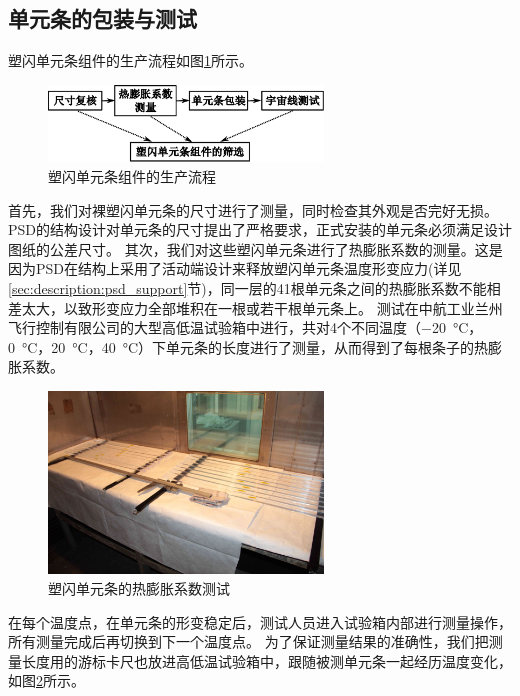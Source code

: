 \subsection{单元条的包装与测试}
\label{sec:construction:bar_wrapping_and_test}

塑闪单元条组件的生产流程如图\ref{fig:construction:bar_production}所示。
\begin{figure}[htbp]
	\centering
	\includegraphics[width=0.65\textwidth]{chap/construction/fig/bar_production.eps}
	\caption{塑闪单元条组件的生产流程}
	\label{fig:construction:bar_production}
\end{figure}
首先，我们对裸塑闪单元条的尺寸进行了测量，同时检查其外观是否完好无损。PSD的结构设计对单元条的尺寸提出了严格要求，正式安装的单元条必须满足设计图纸的公差尺寸。
其次，我们对这些塑闪单元条进行了热膨胀系数的测量。这是因为PSD在结构上采用了活动端设计来释放塑闪单元条温度形变应力(详见\ref{sec:description:psd_support}节)，同一层的41根单元条之间的热膨胀系数不能相差太大，以致形变应力全部堆积在一根或若干根单元条上。
测试在中航工业兰州飞行控制有限公司的大型高低温试验箱中进行，共对4个不同温度（\SI{-20}{\celsius}，\SI{0}{\celsius}，\SI{20}{\celsius}，\SI{40}{\celsius}）下单元条的长度进行了测量，从而得到了每根条子的热膨胀系数。
\begin{figure}[htbp]
	\centering
	\includegraphics[width=0.65\textwidth]{chap/construction/fig/bar_cylcling.jpg}
	\caption{塑闪单元条的热膨胀系数测试}
	\label{fig:construction:bar_cylcling}
\end{figure}
在每个温度点，在单元条的形变稳定后，测试人员进入试验箱内部进行测量操作，所有测量完成后再切换到下一个温度点。
为了保证测量结果的准确性，我们把测量长度用的游标卡尺也放进高低温试验箱中，跟随被测单元条一起经历温度变化，如图\ref{fig:construction:bar_cylcling}所示。



